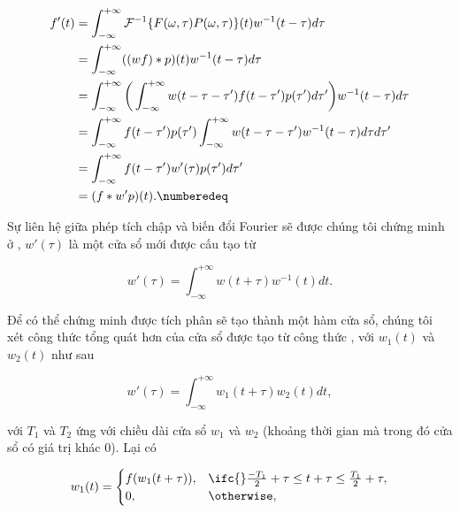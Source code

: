 			\begin{align*}
				f'(t) 	& = \int_{-\infty}^{+\infty} \mathcal{F}^{-1}\{F(\omega, \tau) P(\omega, \tau)\}(t) w^{-1}(t - \tau) d\tau \\
						& = \int_{-\infty}^{+\infty} ((wf) \ast p)(t) w^{-1}(t - \tau) d\tau \\
						& = \int_{-\infty}^{+\infty} \bigg( \int_{-\infty}^{+\infty} w(t - \tau - \tau') f(t - \tau') p(\tau') d\tau' \bigg) w^{-1}(t - \tau) d\tau \\
						& = \int_{-\infty}^{+\infty} f(t - \tau') p(\tau') \int_{-\infty}^{+\infty} w(t - \tau - \tau') w^{-1}(t - \tau) d\tau d\tau' \\ %
						& = \int_{-\infty}^{+\infty} f(t - \tau') w'(\tau) p(\tau') d\tau' \\
						& = (f \ast w'p)(t). \numberedeq
				\label{ola::modified_spectrogram_f'}
			\end{align*}
		
		Sự liên hệ giữa phép tích chập và biến đổi Fourier sẽ được chúng tôi chứng minh ở , $w'(\tau)$ là một cửa sổ mới được cấu tạo từ
		
			\begin{equation}
				w'(\tau) = \int_{-\infty}^{+\infty} w(t + \tau) w^{-1}(t) dt.
				\label{ola::modified_spectrogram_windows_integral}
			\end{equation}
		
		Để có thể chứng minh được tích phân  sẽ tạo thành một hàm cửa sổ, chúng tôi xét công thức tổng quát hơn của cửa sổ được tạo từ công thức , với $w_1(t)$ và $w_2(t)$ như sau
		
			\begin{equation}
				w'(\tau) = \int_{-\infty}^{+\infty} w_1(t + \tau) w_2(t) dt,
				\label{ola::modified_spectrogram_general_windows_integral}
			\end{equation}
		
		\noindent với $T_1$ và $T_2$ ứng với chiều dài cửa sổ $w_1$ và $w_2$ (khoảng thời gian mà trong đó cửa sổ có giá trị khác $0$).  Lại có
		
			\begin{equation}
				w_1(t) = \begin{cases}
					f(w_1(t + \tau)),		& \ifc{} \frac{-T_1}{2} + \tau \le t + \tau \le \frac{T_1}{2} + \tau, \\
					0,						& \otherwise,
				\end{cases}
			\end{equation}
		
